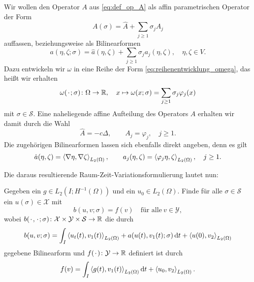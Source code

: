 Wir wollen den Operator $A$ aus \eqref{eq:def_op_A} als affin parametrischen Operator der Form
\begin{equation}
    \label{eq:aff_zerlegung_A}
    A(\sigma) = \hat A + \sum_{j \geq 1} \sigma_{j} A_{j}
\end{equation}
auffassen, beziehungsweise als Bilinearformen
\begin{equation}
     \label{eq:aff_zerelgung_A_bf}
     a(\eta, \zeta; \sigma) = \hat a(\eta, \zeta) + \sum_{j \geq 1} \sigma_{j} a_{j}(\eta, \zeta), \quad \eta, \zeta \in V.
 \end{equation}
Dazu entwickeln wir $\omega$ in eine Reihe der Form \eqref{eq:reihenentwicklung_omega}, das heißt wir erhalten
\begin{equation}
    \label{eq:omega_reihenentwicklung}
    \omega({\mkern2mu\cdot\mkern2mu}; \sigma) \colon \Omega \to \mathbb{R}, \quad x \mapsto \omega(x; \sigma) = \sum_{j \geq 1} \sigma_{j} \varphi_{j}(x)
\end{equation}
mit $\sigma \in \mathcal S$.
Eine naheliegende affine Aufteilung des Operators $A$ erhalten wir damit durch die Wahl
\begin{equation}
    \label{eq:affine_zerlegung_A_def}
    \hat A = - c \Delta, \qquad
    A_{j} = \varphi_{j}, \quad j \geq 1.
\end{equation}
Die zugehörigen Bilinearformen lassen sich ebenfalls direkt angeben, denn es gilt
\begin{equation}
    \hat a(\eta, \zeta) = \left\langle\nabla \eta,\nabla \zeta\right\rangle_{L_{2}(\Omega)}, \qquad a_{j}(\eta, \zeta) = \left\langle\varphi_{j} \eta,\zeta\right\rangle_{L_{2}(\Omega)}, \quad j \geq 1.
\end{equation}

Die daraus resultierende Raum-Zeit-Variationsformulierung lautet nun:
\begin{Problem}
    Gegeben ein $g \in L_{2}(I; H^{-1}(\Omega))$ und ein $u_{0} \in L_{2}(\Omega)$.
    Finde für alle $\sigma \in \mathcal S$ ein $u(\sigma) \in \mathcal X$ mit
    \begin{equation}
        \label{eq:varprob_2}
        b(u, v; \sigma) = f(v) \quad \text{für alle}~v \in \mathcal Y,
    \end{equation}
    wobei $b({\mkern2mu\cdot\mkern2mu}, {\mkern2mu\cdot\mkern2mu}; \sigma) \colon \mathcal X \times \mathcal Y \times \mathcal S \to \mathbb{R}$ die durch
    \begin{equation}
        \label{eq:buv_2}
        b(u, v; \sigma)
            = \int_{I} \left\langle u_{t}(t),v_{1}(t)\right\rangle_{L_{2}(\Omega)} + a(u(t), v_{1}(t); \sigma) \mathop{}\!\mathrm{d} t + \left\langle u(0),v_{2}\right\rangle_{L_{2}(\Omega)}
    \end{equation}
    gegebene Bilinearform und $f({\mkern2mu\cdot\mkern2mu}) \colon \mathcal Y \to \mathbb{R}$ definiert ist durch
    \begin{equation}
        \label{eq:var_all_f_wiederholung_2}
        f(v) = \int_{I} \left\langle g(t),v_{1}(t)\right\rangle_{L_{2}(\Omega)} \mathop{}\!\mathrm{d} t + \left\langle u_{0},v_{2}\right\rangle_{L_{2}(\Omega)}.
    \end{equation}
\end{Problem}

